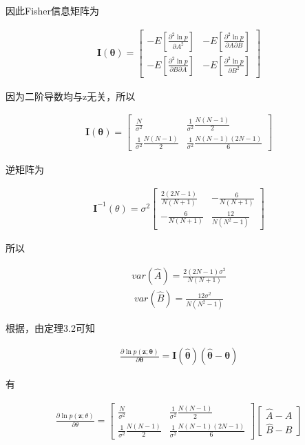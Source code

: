 \documentclass[fontset=windows]{article}
\numberwithin{figure}{section}
\begin{document}
因此Fisher信息矩阵为

\begin{align*}
	\mathbf{I}(\boldsymbol{\theta})=
	\begin{bmatrix}
		-E[\frac{\partial^2 \ln p}{\partial A^2}]          & -E[\frac{\partial^2 \ln p}{\partial A\partial B}] \\
		-E[\frac{\partial^2 \ln p}{\partial B \partial A}] & -E[\frac{\partial^2 \ln p}{\partial B^2}]
	\end{bmatrix}
\end{align*}

因为二阶导数均与z无关，所以

\begin{align*}
	\mathbf{I}(\boldsymbol{\theta})=
	\begin{bmatrix}
		\frac{N}{\sigma^2}                 & \frac{1}{\sigma^2}\frac{N(N-1)}{2}       \\
		\frac{1}{\sigma^2}\frac{N(N-1)}{2} & \frac{1}{\sigma^2}\frac{N(N-1)(2N-1)}{6}
	\end{bmatrix}
\end{align*}

逆矩阵为

\begin{align*}
	\mathbf{I}^{-1}(\theta)=\sigma^2
	\begin{bmatrix}
		\frac{2(2N-1)}{N(N+1)} & -\frac{6}{N(N+1)}   \\
		-\frac{6}{N(N+1)}      & \frac{12}{N(N^2-1)}
	\end{bmatrix}
\end{align*}

所以

\begin{align*}
	var(\hat{A})=\frac{2(2N-1)\sigma^2}{N(N+1)}
\end{align*}
\begin{align*}
	var(\hat{B})=\frac{12\sigma^2}{N(N^2-1)}
\end{align*}

根据，由定理3.2可知

\begin{align*}
	\frac{\partial \ln p(\mathbf{z};\boldsymbol{\theta})}{\partial \boldsymbol{\theta}}=
	\mathbf{I}(\hat{\boldsymbol{\theta}})(\hat{\boldsymbol{\theta}}-\boldsymbol{\theta})
\end{align*}

有

\begin{align*}
	\frac{\partial \ln p(\mathbf{z};\theta)}{\partial \theta}=
	\begin{bmatrix}
		\frac{N}{\sigma^2}                 & \frac{1}{\sigma^2}\frac{N(N-1)}{2}       \\
		\frac{1}{\sigma^2}\frac{N(N-1)}{2} & \frac{1}{\sigma^2}\frac{N(N-1)(2N-1)}{6}
	\end{bmatrix}
	\begin{bmatrix}
		\hat{A}-A \\
		\hat{B}-B
	\end{bmatrix}
\end{align*}
\end{document}
